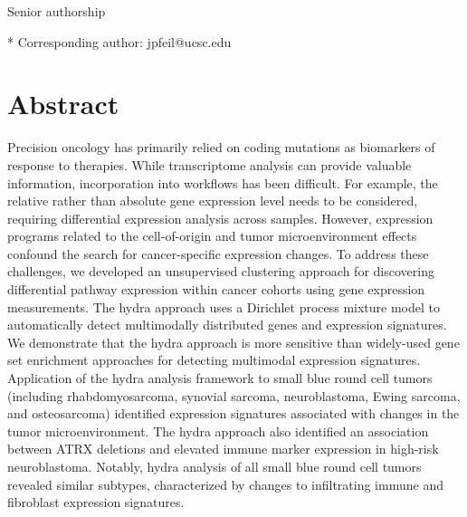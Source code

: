 \documentclass[10pt,letterpaper]{article}
\begin{document}
\begin{flushleft}
%
%

\ddag Senior authorship




* Corresponding author: jpfeil@ucsc.edu

\end{flushleft}
\section*{Abstract}
Precision oncology has primarily relied on coding mutations as biomarkers of response to therapies. While transcriptome analysis can provide valuable information, incorporation into workflows has been difficult. For example, the relative rather than absolute gene expression level needs to be considered, requiring differential expression analysis across samples. However, expression programs related to the cell-of-origin and tumor microenvironment effects confound the search for cancer-specific expression changes. To address these challenges, we developed an unsupervised clustering approach for discovering differential pathway expression within cancer cohorts using gene expression measurements. The hydra approach uses a Dirichlet process mixture model to automatically detect multimodally distributed genes and expression signatures. We demonstrate that the hydra approach is more sensitive than widely-used gene set enrichment approaches for detecting multimodal expression signatures. Application of the hydra analysis framework to small blue round cell tumors (including rhabdomyosarcoma, synovial sarcoma, neuroblastoma, Ewing sarcoma, and osteosarcoma) identified expression signatures associated with changes in the tumor microenvironment. The hydra approach also identified an association between ATRX deletions and elevated immune marker expression in high-risk neuroblastoma. Notably, hydra analysis of all small blue round cell tumors revealed similar subtypes, characterized by changes to infiltrating immune and fibroblast expression signatures.
\end{document}
